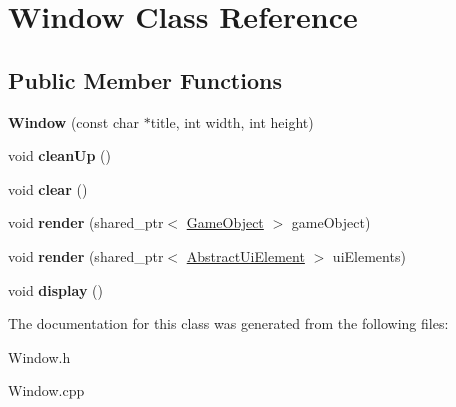 \hypertarget{class_window}{}\section{Window Class Reference}
\label{class_window}
\subsection*{Public Member Functions}
\begin{DoxyCompactItemize}
\item 
\mbox{\label{class_window_a315084d17424d10fe4a77c581084b65a}} 
{\bfseries Window} (const char $\ast$title, int width, int height)
\item 
\mbox{\label{class_window_a67aa17a1206fac5155419b2190a92f79}} 
void {\bfseries clean\+Up} ()
\item 
\mbox{\label{class_window_a38bc43bdd1a97e5de7f346ba4c3957ef}} 
void {\bfseries clear} ()
\item 
\mbox{\label{class_window_a66d21dab1d69940a7ab94ada4b4de2ef}} 
void {\bfseries render} (shared\+\_\+ptr$<$ \mbox{\hyperlink{class_game_object}{Game\+Object}} $>$ game\+Object)
\item 
\mbox{\label{class_window_acbae8e1c26c028628d14d8b97c03b424}} 
void {\bfseries render} (shared\+\_\+ptr$<$ \mbox{\hyperlink{class_abstract_ui_element}{Abstract\+Ui\+Element}} $>$ ui\+Elements)
\item 
\mbox{\label{class_window_afadfafa5a0b9472554759004aafb327e}} 
void {\bfseries display} ()
\end{DoxyCompactItemize}


The documentation for this class was generated from the following files\+:\begin{DoxyCompactItemize}
\item 
Window.\+h\item 
Window.\+cpp\end{DoxyCompactItemize}
